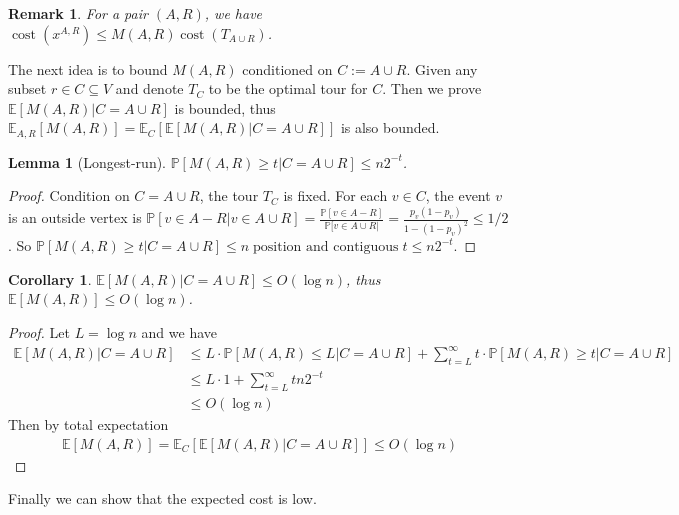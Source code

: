 \documentclass[11pt]{article}
\newtheorem{lemma}{Lemma}
\newtheorem{corollary}{Corollary}
\newtheorem{remark}{Remark}
\newcommand{\E}{\mathbb{E}}
\newcommand{\Prb}{\mathbb{P}}
\newcommand{\1}{\mathbf{1}}
\newcommand{\cost}{\operatorname{cost}}
\begin{document}
\begin{remark}
    For a pair $(A, R)$, we have $\cost(x^{A,R}) \le M(A,R) \cost(T_{A \cup R})$.
\end{remark}

The next idea is to bound $M(A, R)$ conditioned on $C := A \cup R$. Given 
any subset $r \in C \subseteq V$ and denote $T_C$ to be the optimal tour for $C$.
Then we prove $\E[M(A,R) | C = A \cup R]$ is bounded, thus $\E_{A,R}[M(A,R)] = \E_C [\E[M(A,R) | C = A \cup R]]$ 
is also bounded.

\begin{lemma}[Longest-run]
    $\Prb[M(A,R) \ge t|C=A\cup R] \le n 2^{-t}$.
\end{lemma}
\begin{proof}
    Condition on $C = A \cup R$, the tour $T_C$ is fixed. For each $v \in C$, 
    the event $v$ is an outside vertex is $\Prb[v \in A - R | v \in A \cup R] = 
    \frac{\Prb[v \in A - R]}{\Prb[v \in A \cup R|} = \frac{p_v(1-p_v)}{1-(1-p_v)^2} \le 1/2$.
    So $\Prb[M(A,R) \ge t | C = A \cup R] \le n \; \text{position and contiguous} \; t \le n 2^{-t}$.
\end{proof}
\begin{corollary}
    $\E[M(A,R)|C=A\cup R] \le O(\log n)$, thus
    $\E[M(A,R)] \le O(\log n)$.
\end{corollary}

\begin{proof}
    Let $L = \log n$ and we have
    \begin{align*}
        \E[M(A,R)|C=A \cup R] &\le L \cdot \Prb[M(A,R) \le L | C = A \cup R]  + \sum_{t=L}^{\infty} t \cdot \Prb[M(A,R) \ge t | C = A \cup R] \\
                              &\le L \cdot 1 + \sum_{t=L}^{\infty} t n 2^{-t} \\ 
                              &\le O(\log n)
    \end{align*}
    Then by total expectation 
    \begin{align*}
        \E[M(A,R)] = \E_{C} [\E[M(A,R) | C = A \cup R]] \le O(\log n)
    \end{align*}
\end{proof}


Finally we can show that the expected cost is low.
\end{document}
